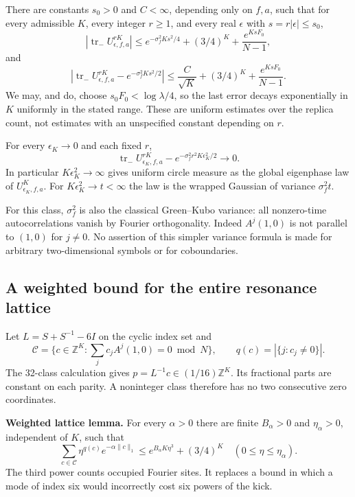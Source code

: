 \begin{theorem}\label{pass1:return_position-1} There are constants \(s_0>0\) and \(C<\infty\), depending
only on \(f,a\), such that for every admissible \(K\), every integer \(r\ge1\),
and every real \(\epsilon\) with \(s=r|\epsilon|\le s_0\),
\[
 |\operatorname{tr}_-U_{\epsilon,f,a}^{rK}|
 \le e^{-\sigma_f^2Ks^2/4}+(3/4)^K
                                   +\frac{e^{KsF_0}}{N-1}, \tag{Ret.A1}
\]
and
\[
 \left|\operatorname{tr}_-U_{\epsilon,f,a}^{rK}
                     -e^{-\sigma_f^2Ks^2/2}\right|
 \le \frac{C}{\sqrt K}+(3/4)^K
                                   +\frac{e^{KsF_0}}{N-1}. \tag{Ret.A2}
\]
We may, and do, choose \(s_0F_0<\log\lambda/4\), so the last error
decays exponentially in \(K\) uniformly in the stated range.
These are uniform estimates over the replica count, not estimates with
an unspecified constant depending on \(r\).
\end{theorem}

For every \(\epsilon_K\to0\) and each fixed \(r\),
\[
 \operatorname{tr}_-U_{\epsilon_K,f,a}^{rK}
            -e^{-\sigma_f^2r^2K\epsilon_K^2/2}\to0.          \tag{Ret.A3}
\]
In particular \(K\epsilon_K^2\to\infty\) gives uniform circle measure
as the global eigenphase law of \(U_{\epsilon_K,f,a}^K\).
For \(K\epsilon_K^2\to t<\infty\) the law is the wrapped Gaussian
of variance \(\sigma_f^2t\).

For this class, \(\sigma_f^2\) is also the classical Green--Kubo variance:
all nonzero-time autocorrelations vanish by Fourier orthogonality.
Indeed \(A^j(1,0)\) is not parallel to \((1,0)\) for \(j\ne0\).
No assertion of this simpler variance formula is made for arbitrary
two-dimensional symbols or for coboundaries.

\hypertarget{a-weighted-bound-for-the-entire-resonance-lattice}{%
\subsection{A weighted bound for the entire resonance lattice}\label{a-weighted-bound-for-the-entire-resonance-lattice}}

Let \(L=S+S^{-1}-6I\) on the cyclic index set and
\[
 \mathcal C=\{c\in\mathbb Z^K:\sum_jc_jA^j(1,0)=0\bmod N\},
 \qquad q(c)=|\{j:c_j\ne0\}|.
\]
The 32-class calculation gives \(p=L^{-1}c\in(1/16)\mathbb Z^K\).
Its fractional parts are constant on each parity.
A noninteger class therefore has no two consecutive zero coordinates.

\textbf{Weighted lattice lemma.} For every \(\alpha>0\) there are finite
\(B_\alpha>0\) and \(\eta_\alpha>0\), independent of \(K\), such that
\[
 \sum_{c\in\mathcal C}\eta^{q(c)}e^{-\alpha\|c\|_1}
 \le e^{B_\alpha K\eta^3}+(3/4)^K
                       \quad(0\le\eta\le\eta_\alpha).       \tag{Ret.A4}
\]
The third power counts occupied Fourier sites. It replaces a bound in
which a mode of index six would incorrectly cost six powers of the kick.

